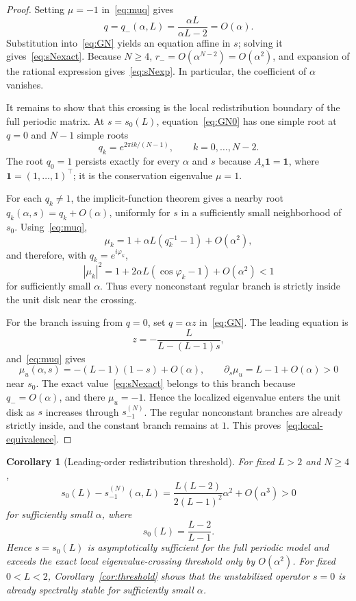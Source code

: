\documentclass[preprint,12pt]{elsarticle}
\newtheorem{corollary}[theorem]{Corollary}
\begin{document}
\begin{proof}
Setting $\mu=-1$ in~\eqref{eq:muq} gives
\[
    q=q_-(\alpha,L)=\frac{\alpha L}{\alpha L-2}=O(\alpha).
\]
Substitution into~\eqref{eq:GN} yields an equation affine in $s$; solving it
gives~\eqref{eq:sNexact}.  Because $N\ge4$,
$r_-=O(\alpha^{N-2})=O(\alpha^2)$, and expansion of the rational expression
gives~\eqref{eq:sNexp}.  In particular, the coefficient of $\alpha$ vanishes.

It remains to show that this crossing is the local redistribution boundary
of the full periodic matrix.  At $s=s_0(L)$, equation~\eqref{eq:GN0} has one simple root at
$q=0$ and $N-1$ simple roots
\[
    q_k=e^{2\pi i k/(N-1)},\qquad k=0,\ldots,N-2.
\]
The root $q_0=1$ persists exactly for every $\alpha$ and $s$ because
$A_s\mathbf 1=\mathbf 1$, where $\mathbf 1=(1,\ldots,1)^\top$; it is the
conservation eigenvalue $\mu=1$.

For each $q_k\ne1$, the implicit-function theorem gives a nearby root
$q_k(\alpha,s)=q_k+O(\alpha)$, uniformly for $s$ in a sufficiently small
neighborhood of $s_0$.  Using~\eqref{eq:muq},
\[
    \mu_k
    =
    1+\alpha L(q_k^{-1}-1)+O(\alpha^2),
\]
and therefore, with $q_k=e^{i\varphi_k}$,
\[
    |\mu_k|^2
    =
    1+2\alpha L(\cos\varphi_k-1)+O(\alpha^2)<1
\]
for sufficiently small $\alpha$.  Thus every nonconstant regular branch is
strictly inside the unit disk near the crossing.

For the branch issuing from $q=0$, set $q=\alpha z$ in~\eqref{eq:GN}.  The
leading equation is
\[
    z=-\frac{L}{L-(L-1)s},
\]
and~\eqref{eq:muq} gives
\[
    \mu_u(\alpha,s)
    =
    -(L-1)(1-s)+O(\alpha),
    \qquad
    \partial_s\mu_u=L-1+O(\alpha)>0
\]
near $s_0$.  The exact value~\eqref{eq:sNexact} belongs to this branch because
$q_-=O(\alpha)$, and there $\mu_u=-1$.  Hence the localized eigenvalue enters
the unit disk as $s$ increases through $s_{-1}^{(N)}$.  The regular
nonconstant branches are already strictly inside, and the constant branch
remains at $1$.  This proves~\eqref{eq:local-equivalence}.
\end{proof}

\begin{corollary}[Leading-order redistribution threshold]
\label{cor:s0practical}
For fixed $L>2$ and $N\ge4$,
\[
 s_0(L)-s_{-1}^{(N)}(\alpha,L)
 =
 \frac{L(L-2)}{2(L-1)^2}\alpha^2+O(\alpha^3)>0
\]
for sufficiently small $\alpha$, where
\begin{equation}
    s_0(L)=\frac{L-2}{L-1}.
    \label{eq:smodel}
\end{equation}
Hence $s=s_0(L)$ is asymptotically sufficient for the full periodic model and
exceeds the exact local eigenvalue-crossing threshold only by $O(\alpha^2)$.  For fixed
$0<L<2$, Corollary~\ref{cor:threshold} shows that the unstabilized operator
$s=0$ is already spectrally stable for sufficiently small $\alpha$.
\end{corollary}
\end{document}
